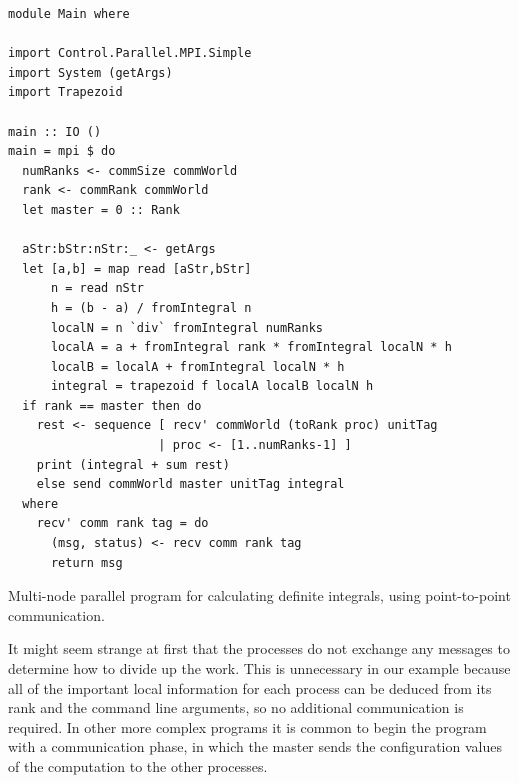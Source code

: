 \documentclass{tmr}
\newcommand{\Todo}[1]{{\textbf{Todo: #1}}}
\begin{document}
\begin{listing}
\begin{Verbatim}
module Main where

import Control.Parallel.MPI.Simple
import System (getArgs)
import Trapezoid

main :: IO ()
main = mpi $ do
  numRanks <- commSize commWorld
  rank <- commRank commWorld
  let master = 0 :: Rank

  aStr:bStr:nStr:_ <- getArgs
  let [a,b] = map read [aStr,bStr]
      n = read nStr
      h = (b - a) / fromIntegral n
      localN = n `div` fromIntegral numRanks
      localA = a + fromIntegral rank * fromIntegral localN * h
      localB = localA + fromIntegral localN * h
      integral = trapezoid f localA localB localN h
  if rank == master then do
    rest <- sequence [ recv' commWorld (toRank proc) unitTag
                     | proc <- [1..numRanks-1] ]
    print (integral + sum rest)
    else send commWorld master unitTag integral
  where
    recv' comm rank tag = do
      (msg, status) <- recv comm rank tag
      return msg
\end{Verbatim}
\caption{Multi-node parallel program for calculating definite
  integrals, using point-to-point communication. \label{mpi-p2p}}
\end{listing}


It might seem strange at first that the processes do not exchange any
messages to determine how to divide up the work.
This is unnecessary in our example because all of the important
local information for each process can be deduced from its rank and
the command line arguments, so no additional communication is required.
In other more complex programs it is common to begin the program with
a communication phase, in which the master sends the configuration
values of the computation to the other processes.
\end{document}
